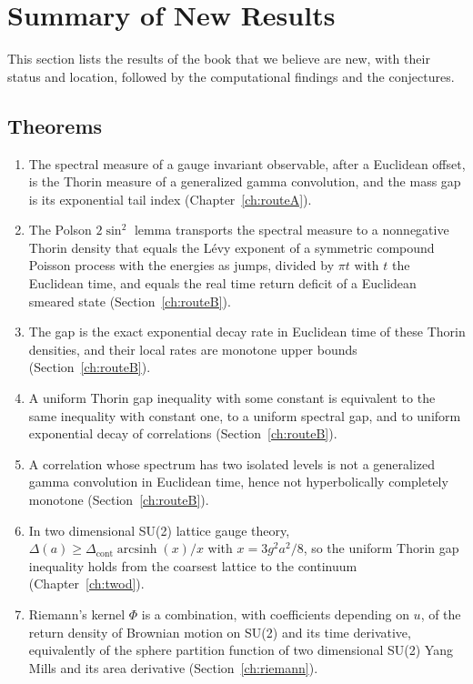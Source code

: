 \section{Summary of New Results}\label{ch:results}

This section lists the results of the book that we believe are new, with their status and location, followed by the computational findings and the conjectures.

\subsection{Theorems}

\begin{enumerate}
\item The spectral measure of a gauge invariant observable, after a Euclidean offset, is the Thorin measure of a generalized gamma convolution, and the mass gap is its exponential tail index (Chapter~\ref{ch:routeA}).
\item The Polson $2\sin^2$ lemma transports the spectral measure to a nonnegative Thorin density that equals the L\'evy exponent of a symmetric compound Poisson process with the energies as jumps, divided by $\pi t$ with $t$ the Euclidean time, and equals the real time return deficit of a Euclidean smeared state (Section~\ref{ch:routeB}).
\item The gap is the exact exponential decay rate in Euclidean time of these Thorin densities, and their local rates are monotone upper bounds (Section~\ref{ch:routeB}).
\item A uniform Thorin gap inequality with some constant is equivalent to the same inequality with constant one, to a uniform spectral gap, and to uniform exponential decay of correlations (Section~\ref{ch:routeB}).
\item A correlation whose spectrum has two isolated levels is not a generalized gamma convolution in Euclidean time, hence not hyperbolically completely monotone (Section~\ref{ch:routeB}).
\item In two dimensional SU(2) lattice gauge theory, $\Delta(a)\ge\Delta_{\mathrm{cont}}\operatorname{arcsinh}(x)/x$ with $x=3g^2a^2/8$, so the uniform Thorin gap inequality holds from the coarsest lattice to the continuum (Chapter~\ref{ch:twod}).
\item Riemann's kernel $\Phi$ is a combination, with coefficients depending on $u$, of the return density of Brownian motion on SU(2) and its time derivative, equivalently of the sphere partition function of two dimensional SU(2) Yang Mills and its area derivative (Section~\ref{ch:riemann}).

\end{enumerate}
